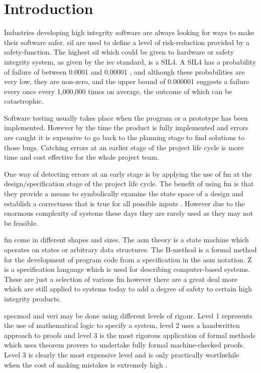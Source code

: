 
\chapter{Introduction}
\label{ch:introduction}

Industries developing high integrity software are always looking for ways to make their software safer. \gls{sil} are used to define a level of risk-reduction provided by a safety-function. The highest \gls{sil} \cite{siliso} which could be given to hardware or safety integrity system, as given by the \gls{iec} \cite{iec} standard, is a SIL4. A SIL4 has a probability of failure of between 0.0001 and 0.00001 \cite{IEC61508}, and although these probabilities are very low, they are non-zero, and the upper bound of 0.000001 suggests a failure every once every 1,000,000 times on average, the outcome of which can be catastrophic.

Software testing usually takes place when the program or a prototype has been implemented. However by the time the product is fully implemented and errors are caught it is expensive to go back to the planning stage to find solutions to those bugs. Catching errors at an earlier stage of the project life cycle is more time and cost effective for the whole project team.

One way of detecting errors at an early stage is by applying the use of \gls{fm} at the design/specification stage of the project life cycle. The benefit of using \gls{fm} is that they provide a means to symbolically examine the state space of a design and establish a correctness that is true for all possible inputs \cite{wifrm}. However due to the enormous complexity of systems these days they are rarely used as they may not be feasible. 

\Gls{fm} come in different shapes and sizes. The \gls{asm} theory \cite{Borger:2003:ASM:829603} is a state machine which operates on states or arbitrary data structures. The B-method \cite{bmeth} is a formal method for the development of program code from a specification in the \gls{asm} notation. Z \cite{spiveyreferencemanual} is a specification language which is used for describing computer-based systems. These are just a selection of various \gls{fm} however there are a great deal more which are still applied to systems today to add a degree of safety to certain high integrity products.

\Gls{specmod} and \gls{veri} may be done using different levels of rigour. Level 1 represents the use of mathematical logic to specify a system, level 2 uses a handwritten approach to proofs and level 3 is the most rigorous application of formal methods which uses theorem provers to undertake fully formal machine-checked proofs. Level 3 is clearly the most expensive level and is only practically worthwhile when the cost of making mistakes is extremely high \cite{encyclopedia}.

